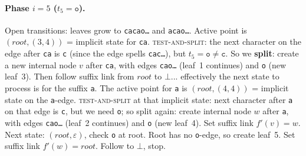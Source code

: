 \paragraph{Phase $i=5$ ($t_5 = \texttt{o}$).}
Open transitions: leaves grow to \texttt{cacao\ldots} and
\texttt{acao\ldots}.
Active point is $(root, (3,4))$ = implicit state for \texttt{ca}.
\textsc{test-and-split}: the next character on the edge after
\texttt{ca} is \texttt{c} (since the edge spells
\texttt{cac\ldots}), but $t_5 = \texttt{o} \neq \texttt{c}$.
So we \textbf{split}: create a new internal node $v$ after
\texttt{ca}, with edges \texttt{cao\ldots} (leaf~1 continues) and
\texttt{o} (new leaf~3).
Then follow suffix link from $root$ to $\bot$... effectively the next
state to process is for the suffix \texttt{a}.
The active point for \texttt{a} is $(root, (4,4))$ = implicit state
on the \texttt{a}-edge.
\textsc{test-and-split} at that implicit state: next character
after \texttt{a} on that edge is \texttt{c}, but we need \texttt{o};
so split again: create internal node $w$ after \texttt{a}, with
edges \texttt{cao\ldots} (leaf~2 continues) and \texttt{o} (new leaf~4).
Set suffix link $f'(v) = w$.
Next state: $(root, \varepsilon)$, check \texttt{o} at root.
Root has no \texttt{o}-edge, so create leaf~5.
Set suffix link $f'(w) = root$.
Follow to $\bot$, stop.

